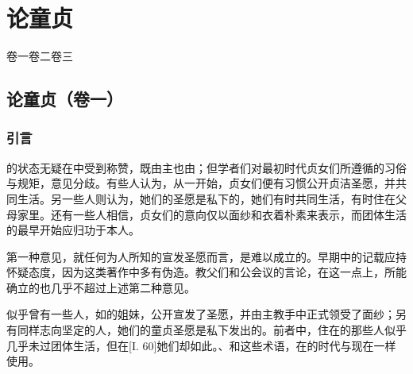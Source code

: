 
\chapter{论童贞}


卷一\newline{}卷二\newline{}卷三\par



\section{论童贞（卷一）}


\subsection{引言}

的状态无疑在中受到称赞，既由主也由；但学者们对最初时代贞女们所遵循的习俗与规矩，意见分歧。有些人认为，从一开始，贞女们便有习惯公开贞洁圣愿，并共同生活。另一些人则认为，她们的圣愿是私下的，她们有时共同生活，有时住在父母家里。还有一些人相信，贞女们的意向仅以面纱和衣着朴素来表示，而团体生活的最早开始应归功于本人。\par

第一种意见，就任何为人所知的宣发圣愿而言，是难以成立的。早期中的记载应持怀疑态度，因为这类著作中多有伪造。教父们和公会议的言论，在这一点上，所能确立的也几乎不超过上述第二种意见。\par

似乎曾有一些人，如的姐妹，公开宣发了圣愿，并由主教手中正式领受了面纱；另有同样志向坚定的人，她们的童贞圣愿是私下发出的。前者中，住在的那些人似乎几乎未过团体生活，但在[I. 60]她们却如此。、和这些术语，在的时代与现在一样使用。\par

